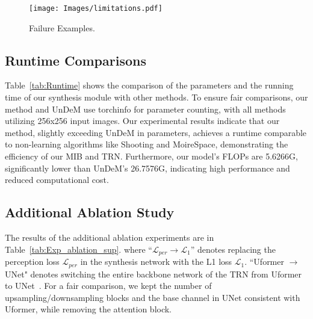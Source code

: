



\begin{figure}[t]
  \centering
    \texttt{[image: Images/limitations.pdf]}
\vspace{-1ex}
 \caption{Failure Examples.} 
  \label{fig:limitations}
\end{figure}






\subsection{Runtime Comparisons}
\label{sec:runtime}
Table~\ref{tab:Runtime} shows the comparison of the parameters and the running time of our synthesis module with other methods. 
To ensure fair comparisons, our method and UnDeM use torchinfo for parameter counting, with all methods utilizing 256x256 input images.
Our experimental results indicate that our method, slightly exceeding UnDeM in parameters, achieves a runtime comparable to non-learning algorithms like Shooting and MoireSpace, demonstrating the efficiency of our MIB and TRN.
Furthermore, our model's FLOPs are 5.6266G, significantly lower than UnDeM's 26.7576G, indicating high performance and reduced computational cost.


\subsection{Additional Ablation Study}
\label{sec:sup_ablation}
The results of the additional ablation experiments are in Table~\ref{tab:Exp_ablation_sup}. 
where ``$\mathcal{L}_{per} \rightarrow \mathcal{L}_1$'' denotes replacing the perception loss $\mathcal{L}_{per}$ in the synthesis network with the L1 loss $\mathcal{L}_1$. ``Uformer $\rightarrow$ UNet" denotes switching the entire backbone network of the TRN from Uformer to UNet~\cite{ronneberger2015u}. For a fair comparison, we kept the number of upsampling/downsampling blocks and the base channel in UNet consistent with Uformer, while removing the attention block.



